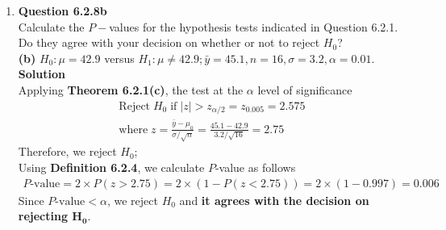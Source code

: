 \documentclass{uofa-eng-assignment}
\begin{document}
 \maketitle
\begin{enumerate}
    \item[]
        \textbf{Question 6.2.8b} \\
        Calculate the $P-$values for the hypothesis tests indicated in Question 6.2.1. \\
        Do they agree with your decision on whether or not to reject $H_0$? \\
        \textbf{(b)}
        ${H_0\!:\mu} = 42.9$ versus $H_1\!:\mu \neq 42.9; \bar{y} =45.1, n=16, \sigma = 3.2, \alpha = 0.01$. \\
        \textbf{Solution} \\
        Applying \textbf{Theorem 6.2.1(c)}, the test at the $\alpha$ level of significance
        \begin{align*}
            \text{Reject}\;H_0\;\text{if}\;|z| > z_{\alpha/2} = z_{0.005} = 2.575 \\
            \text{where}\;z = \frac{\bar{y} - \mu_0}{\sigma / \sqrt{n}} = \frac{45.1 - 42.9}{3.2 / \sqrt{16}} = 2.75
        \end{align*}
        Therefore, we reject $H_0$; \\
        Using \textbf{Definition 6.2.4}, we calculate $P$-value as follows
        \begin{align*}
            P\text{-value} = 2 \times P(z > 2.75) = 2 \times (1 - P(z < 2.75)) = 2 \times (1 - 0.997) = \boldsymbol{0.006}
        \end{align*}
        Since $P\text{-value} < \alpha$, we reject $H_0$ and \textbf{it agrees with the decision on rejecting $\boldsymbol{H_0}$}.

\end{enumerate}
\end{document}
